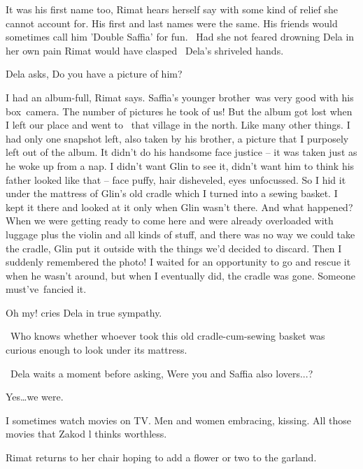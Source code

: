 \documentclass[letterpaper]{article}
\begin{document}
{\textquotedbl}It was his first name too,{\textquotedbl} Rimat hears herself say with some kind of relief she cannot
account for. {\textquotedbl}His first and last names were the same. His friends would sometimes call him 'Double
Saffia' for fun.{\textquotedbl} \ Had she not feared drowning Dela in her own pain Rimat would have clasped \ Dela's
shriveled hands. 

Dela asks, {\textquotedbl}Do you have a picture of him?{\textquotedbl}

{\textquotedbl}I had an album-full,{\textquotedbl} Rimat says. {\textquotedbl}Saffia's younger brother~was very good
with his box~camera. The number of pictures he took of us! But the album got lost when I left our place and went to
\ that village in the north. Like many other things. I had only one snapshot left, also taken by his brother, a picture
that I purposely left out of the album. It didn't do his handsome face justice -- it was taken just as he woke up from
a nap. I didn't want Glin to see it, didn't want him to think his father looked like that -- face puffy, hair
disheveled, eyes unfocussed. So I hid it under the mattress of Glin's old cradle which I turned into a sewing basket. I
kept it there and looked at it only when Glin wasn't there. And what happened? When we were getting ready to come here
and were already overloaded with luggage plus the violin and all kinds of stuff, and there was no way we could take the
cradle, Glin put it outside with the things we'd decided to discard. Then I suddenly remembered the photo! I waited for
an opportunity to go and rescue it when he wasn't around, but when I eventually did, the cradle was gone. Someone
must've~fancied it.{\textquotedbl}

{\textquotedbl}Oh my!{\textquotedbl} cries Dela in true sympathy.

~{\textquotedbl}Who knows whether whoever took this old cradle-cum-sewing basket was curious enough to look under its
mattress.{\textquotedbl}

~Dela waits a moment before asking, {\textquotedbl}Were you and Saffia also lovers...?{\textquotedbl}

{\textquotedbl}Yes{\dots}we were.{\textquotedbl}

{\textquotedbl}I sometimes watch movies on TV. Men and women embracing, kissing. All those movies that Zakod l thinks
worthless.{\textquotedbl}

Rimat returns to her chair hoping to add a flower or two to the garland.
\end{document}
